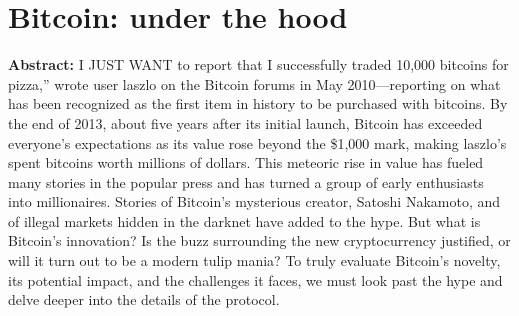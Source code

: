 \section{Bitcoin: under the hood}

\textbf{Abstract:} 
I JUST WANT to report that I successfully traded 10,000 bitcoins for pizza,” wrote user laszlo on the Bitcoin forums in May 2010—reporting on what has been recognized as the first item in history to be purchased with bitcoins. By the end of 2013, about five years after its initial launch, Bitcoin has exceeded everyone’s expectations as its value rose beyond the \$1,000 mark, making laszlo’s spent bitcoins worth millions of dollars. This meteoric rise in value has fueled many stories in the popular press and has turned a group of early enthusiasts into millionaires. Stories of Bitcoin’s mysterious creator, Satoshi Nakamoto, and of illegal markets hidden in the darknet have added to the hype. But what is Bitcoin’s innovation? Is the buzz surrounding the new cryptocurrency justified, or will it turn out to be a modern tulip mania? To truly evaluate Bitcoin’s novelty, its potential impact, and the challenges it faces, we must look past the hype and delve deeper into the details of the protocol.
